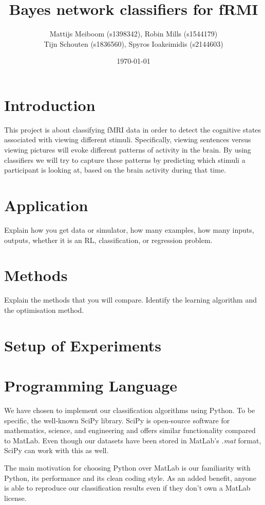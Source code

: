 \documentclass[a4paper, 11pt]{scrartcl}
\title{\Large Bayes network classifiers for fRMI}
\author{\small Mattijs Meiboom (s1398342), Robin Mills (s1544179)\\
			\small Tijn Schouten (s1836560), Spyros Ioakeimidis (s2144603)}
\date{\small \today}
\begin{document}
\maketitle

\thispagestyle{empty}

\section{Introduction}

This project is about classifying fMRI data in order to detect the cognitive states associated with viewing different stimuli. Specifically, viewing sentences versus viewing pictures will evoke different patterns of activity in the brain. By using classifiers we will try to capture these patterns by predicting which stimuli a participant is looking at, based on the brain activity during that time.

\section{Application}

Explain how you get data or simulator, how many examples, how many inputs, outputs, whether it is an RL, classification, or regression problem.

\section{Methods}

Explain the methods that you will compare. Identify the learning algorithm and the optimisation method.

\section{Setup of Experiments}

\section{Programming Language}
\label{sec:language}

We have chosen to implement our classification algorithms using Python. To be specific,  the well-known SciPy library. SciPy is open-source software for mathematics, science, and engineering and offers similar functionality compared to MatLab. Even though our datasets have been stored in MatLab's \textit{.mat} format, SciPy can work with this as well.

The main motivation for choosing Python over MatLab is our familiarity with Python, its performance and its clean coding style. As an added benefit, anyone is able to reproduce our classification results even if they don't own a MatLab license. 
\end{document}
